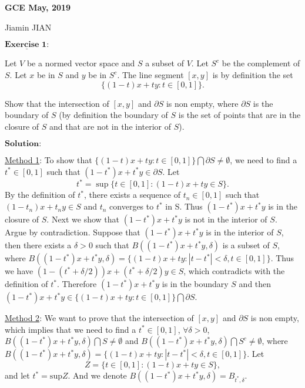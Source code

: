\documentclass[12pt,a4paper]{ctexart}
\begin{document}
\begin{center}
\textbf{ GCE May, 2019}
\vspace{8pt}

Jiamin JIAN
\end{center}

\vspace{12pt}

$\underline{\textbf{Exercise 1:}}$

Let $V$ be a normed vector space and $S$ a subset of $V$. Let $S^{c}$ be the complement of $S$. Let $x$ be in $S$ and $y$ be in $S^{c}$. The line segment $[x, y]$ is by definition the set
\begin{equation*}
    \{(1-t)x + t y : t \in [0, 1] \}.
\end{equation*}

Show that the intersection of $[x, y]$ and $\partial S$ is non empty, where $\partial S$ is the boundary of $S$ (by definition the boundary of $S$ is the set of points that are in the closure of $S$ and that are not in the interior of $S$).

\vspace{8pt}
$\textbf{Solution:}$

\underline{Method 1}: To show that $\{(1-t)x + t y : t \in [0, 1] \} \bigcap \partial S \neq \emptyset$, we need to find a $t^* \in [0, 1]$ such that $(1 - t^*)x + t^* y \in \partial S$. Let 
$$t^* = \sup \{t \in [0,1]: (1-t)x + t y \in S \}.$$
By the definition of $t^*$, there exists a sequence of $t_n \in [0,1]$ such that $(1 - t_n) x + t_n y \in S$ and $t_n$ converges to $t^*$ in S. Thus $(1 - t^*)x + t^* y$ is in the closure of $S$. Next we show that $(1 - t^*)x + t^* y$ is not in the interior of $S$. Argue by contradiction. Suppose that $(1 - t^*)x + t^* y$ is in the interior of $S$, then there exists a $\delta > 0$ such that $B((1 - t^*)x + t^* y, \delta)$ is a subset of $S$, where $B((1-t^{*})x + t^{*}y, \delta) = \{(1-t)x + t y: |t - t^{*} | < \delta, t \in [0, 1] \}.$ Thus we have $(1 - (t^* + \delta/2) )x + (t^* + \delta/2) y \in S$, which contradicts with the definition of $t^*$. Therefore $(1 - t^*)x + t^* y$ is in the boundary $S$ and then $(1 - t^*)x + t^* y \in \{(1-t)x + t y : t \in [0, 1] \} \bigcap \partial S$.

\vspace{8pt}

\underline{Method 2}: We want to prove that the intersection of $[x, y]$ and $\partial S$ is non empty, which implies that we need to find a $t^{*} \in [0, 1]$, $\forall \delta >0$, $B((1-t^{*})x + t^{*}y, \delta) \bigcap S \neq \emptyset$ and $B((1-t^{*})x + t^{*}y, \delta) \bigcap S^{c} \neq \emptyset$, where $B((1-t^{*})x + t^{*}y, \delta) = \{(1-t)x + t y: |t - t^{*} | < \delta, t \in [0, 1] \}.$ Let
\begin{equation*}
    Z = \{t \in [0,1] : (1-t) x + t y \in S \},
\end{equation*}
and let $t^{*} = \text{sup} {Z}$. And we denote $B((1-t^{*})x + t^{*}y, \delta) = B_{t^{*}, \delta}$. 
\end{document}
